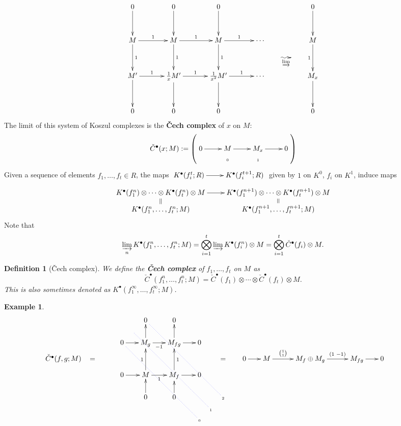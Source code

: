 \documentclass[11pt]{book}
\newtheorem{definition}[theorem]{Definition}
\numberwithin{equation}{section}
\numberwithin{theorem}{chapter}
\theoremstyle{definition}
\newtheorem{example}[theorem]{Example}
\newtheorem*{basic properties}{Basic Properties}
\newtheorem*{Important Remark}{Important Remark}
\theoremstyle{remark}
\begin{document}
$$\xymatrix@R=5mm@C=5mm{0 \ar[dd] && 0 \ar[dd] && 0 \ar[dd] && &&& 0 \ar[dd]\\
\\
	M \ar[rr]^-1 \ar[dd]^-1 && M \ar[rr]^-1 \ar[dd]^-{1} && M \ar[rr]^-1 \ar[dd]^-{1} && \cdots &&& M \ar[dd]_-1\\
	&&&&&&& \ar@{~>}[r]_-{\varinjlim} & \\
	M' \ar[rr]^-1 \ar[dd] && \frac{1}{x} M' \ar[rr]^-1 \ar[dd] &&  \frac{1}{x^2} M' \ar[rr]^-1 \ar[dd] && \cdots &&& M_x \ar[dd]\\
	\\
	0 && 0 && 0 &&&&& 0}$$ 
	The limit of this system of Koszul complexes is the {\bf \v{C}ech complex} of $x$ on $M$:
	$${\check{C}}^\bullet(x;M) := \left( \xymatrix@R=1mm{0 \ar[r] & M \ar[r] & M_x \ar[r] & {\tiny 0} \\ & \textrm{\tiny{0}} & \textrm{\tiny{1}}} \right)$$
	Given a sequence of elements $f_1, \ldots, f_t \in R$, the maps $\xymatrix{K^\bullet(f_i^t;R) \ar[r] & K^\bullet(f_i^{t+1};R)}$ given by $1$ on $K^0$, $f_i$ on $K^1$, induce maps
	$$\xymatrix@R=2mm{K^\bullet(f_1^n) \otimes \cdots \otimes K^\bullet(f_t^n) \otimes M \ar@{=}[d] \ar[r] & K^\bullet(f_1^{n+1}) \otimes \cdots \otimes K^\bullet(f_t^{n+1}) \otimes M \ar@{=}[d] \\ K^\bullet(f_1^n, \ldots, f_t^n;M) & K^\bullet(f_1^{n+1}, \ldots, f_t^{n+1};M)}$$
	Note that
	$$\varinjlim_n K^\bullet(f_1^n, \ldots, f_t^n;M) = \bigotimes^t_{i=1} \varinjlim K^{\bullet}(f_i^n) \otimes M = \bigotimes^t_{i=1} {\check{C}}^\bullet(f_i) \otimes M.$$
	
\begin{definition}[\v{C}ech complex]	We define the {\bf \v{C}ech complex} of $f_1, \ldots, f_t$ on $M$ as
	$${\check{C}}^\bullet(f_1^n, \ldots, f_t^n;M) = {\check{C}}^\bullet(f_1) \otimes \cdots \otimes {\check{C}}^\bullet(f_t) \otimes M.$$
	This is also sometimes denoted as $K^\bullet(f_1^\infty,\dots,f_t^\infty;M)$.
\end{definition}

\begin{example}
	$$ 
	\xymatrix@R=2mm@C=2mm{
	&&&&&& 0 && 0 && \\ 
	&&&&&&&&&&&&&\\
	&&&& 0 \ar[rr] && M_g \ar[rr]_-{-1} \ar[uu] && M_{fg} \ar[uu] \ar[rr] && 0 &&&&&&  \\ 
	{\check{C}}^\bullet(f,g;M) & = &&&&&&&&&&& = && 0 \ar[rr] && M \ar[rrr]^-{{1 \choose 1}} &&& M_f \oplus M_g \ar[rrr]^-{(1 \,\, -1)} &&& M_{fg} \ar[rr] && 0 && \\
	&&&& 0 \ar[rr] && M \ar[uu]^-{1} \ar[rr]_-{1} && M_f \ar[rr] \ar[uu]_-{1} && 0 &&&&& \\ 
	&&& &&&&& &&&&&&& \\
	&&&& && 0 \ar[uu] && 0 \ar[uu] &&&& \textrm{\tiny{2}} \ar@{..}@[blue][uuuuuullllll] \\
	&&&&&&&&&&& \textrm{\tiny{1}} \ar@{..}@[blue][uuuuuullllll] &&&&&& \\
	&&&&&&&&&& \textrm{\tiny{0}} \ar@{..}@[blue][uuuuuullllll]
	 }  
	$$
\end{example}
\end{document}
